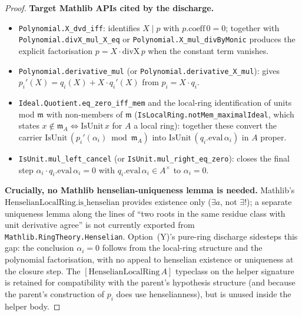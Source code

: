 \begin{proof}
\textbf{Target Mathlib APIs cited by the discharge.}
\begin{itemize}
\item \texttt{Polynomial.X\_dvd\_iff}: identifies $X \mid p$
with $p.\mathrm{coeff}\,0 = 0$; together with
\texttt{Polynomial.divX\_mul\_X\_eq} or
\texttt{Polynomial.X\_mul\_divByMonic} produces the explicit
factorisation $p = X \cdot \mathrm{divX}\,p$ when the constant
term vanishes.
\item \texttt{Polynomial.derivative\_mul} (or
\texttt{Polynomial.derivative\_X\_mul}): gives $p_i'(X) = q_i(X)
+ X \cdot q_i'(X)$ from $p_i = X \cdot q_i$.
\item \texttt{Ideal.Quotient.eq\_zero\_iff\_mem} and the
local-ring identification of units mod $\mathfrak m$ with
non-members of $\mathfrak m$
(\texttt{IsLocalRing.notMem\_maximalIdeal}, which states
$x \notin \mathfrak m_A \Leftrightarrow \mathrm{IsUnit}\,x$
for $A$ a local ring): together these convert the carrier
$\mathrm{IsUnit}\,(p_i'(\alpha_i) \bmod \mathfrak m_A)$ into
$\mathrm{IsUnit}\,(q_i.\mathrm{eval}\,\alpha_i)$ in $A$ proper.
\item \texttt{IsUnit.mul\_left\_cancel} (or
\texttt{IsUnit.mul\_right\_eq\_zero}): closes the final step
$\alpha_i \cdot q_i.\mathrm{eval}\,\alpha_i = 0$ with
$q_i.\mathrm{eval}\,\alpha_i \in A^\times$ to $\alpha_i = 0$.
\end{itemize}
\textbf{Crucially, no Mathlib henselian-uniqueness lemma is
needed.} Mathlib's
$\mathrm{HenselianLocalRing.is\_henselian}$ provides existence
only ($\exists a$, not $\exists!$); a separate uniqueness lemma
along the lines of ``two roots in the same residue class with
unit derivative agree'' is not currently exported from
\texttt{Mathlib.RingTheory.Henselian}. Option~(Y)'s pure-ring
discharge sidesteps this gap: the conclusion $\alpha_i = 0$
follows from the local-ring structure and the polynomial
factorisation, with no appeal to henselian existence or
uniqueness at the closure step. The
$[\mathrm{HenselianLocalRing}\,A]$ typeclass on the helper
signature is retained for compatibility with the parent's
hypothesis structure (and because the parent's construction of
$p_i$ does use henselianness), but is unused inside the helper
body.


\end{proof}
